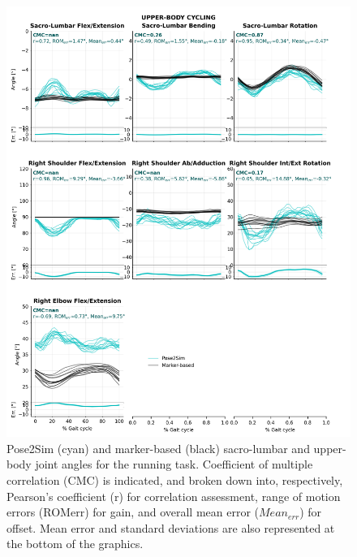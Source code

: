 \begin{figure}[!ht]
	\centering
	\def\svgwidth{1\columnwidth}
	\fontsize{10pt}{10pt}\selectfont
	\includegraphics[height=\dimexpr\textheight-119pt]{"../Annexes/Figures/Fig_QTMBikeUp.png"}
	\caption{Pose2Sim (cyan) and marker-based (black) sacro-lumbar and upper-body joint angles for the running task. Coefficient of multiple correlation (CMC) is indicated, and broken down into, respectively, Pearson’s coefficient (r) for correlation assessment, range of motion errors (ROMerr) for gain, and overall mean error (\(Mean_{err}\)) for offset. Mean error and standard deviations are also represented at the bottom of the graphics.}
	\label{fig_qtmrunup}
\end{figure}

